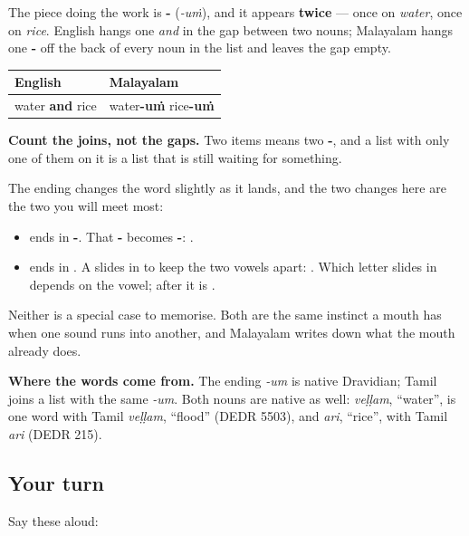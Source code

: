 The piece doing the work is \textbf{-} (\emph{-uṁ}), and it appears \textbf{twice} — once on \emph{water}, once on \emph{rice}. English hangs one \emph{and} in the gap between two nouns; Malayalam hangs one \textbf{-} off the back of every noun in the list and leaves the gap empty.

\noindent
\begin{tabularx}{\linewidth}{@{}>{\raggedright\arraybackslash}X>{\raggedright\arraybackslash}X@{}}
\toprule
\textbf{English} & \textbf{Malayalam} \\
\midrule
water \textbf{and} rice & water\textbf{-uṁ} rice\textbf{-uṁ} \\
\bottomrule
\end{tabularx}

\textbf{Count the joins, not the gaps.} Two items means two \textbf{-}, and a list with only one of them on it is a list that is still waiting for something.

\begin{cousinweb}
The ending changes the word slightly as it lands, and the two changes here are the two you will meet most:

\begin{itemize}
\raggedright
  \item \textbf{} ends in \textbf{-}. That \textbf{-} becomes \textbf{-}: \textbf{}.
  \item \textbf{} ends in \textbf{}. A \textbf{} slides in to keep the two vowels apart: \textbf{}. Which letter slides in depends on the vowel; after \textbf{} it is \textbf{}.
\end{itemize}

Neither is a special case to memorise. Both are the same instinct a mouth has when one sound runs into another, and Malayalam writes down what the mouth already does.

\textbf{Where the words come from.} The ending \emph{-um} is native Dravidian; Tamil joins a list with the same \emph{-um}. Both nouns are native as well: \emph{veḷḷam}, \textquotedblleft{}water\textquotedblright{}, is one word with Tamil \emph{veḷḷam}, \textquotedblleft{}flood\textquotedblright{} (DEDR 5503), and \emph{ari}, \textquotedblleft{}rice\textquotedblright{}, with Tamil \emph{ari} (DEDR 215).
\end{cousinweb}

\subsection*{Your turn}
Say these aloud:

